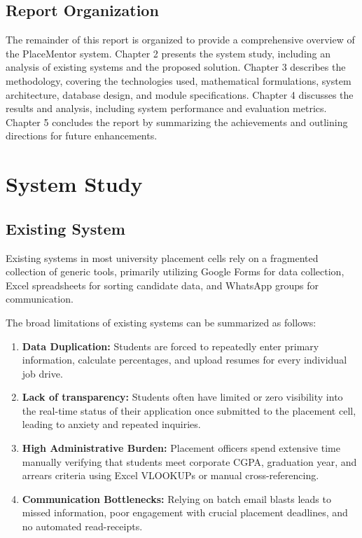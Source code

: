 \documentclass[a4paper,12pt]{report}
\begin{document}
\section{Report Organization}

The remainder of this report is organized to provide a comprehensive overview of the PlaceMentor system. Chapter 2 presents the system study, including an analysis of existing systems and the proposed solution. Chapter 3 describes the methodology, covering the technologies used, mathematical formulations, system architecture, database design, and module specifications. Chapter 4 discusses the results and analysis, including system performance and evaluation metrics. Chapter 5 concludes the report by summarizing the achievements and outlining directions for future enhancements.

\chapter{System Study}

\section{Existing System}

Existing systems in most university placement cells rely on a fragmented collection of generic tools, primarily utilizing Google Forms for data collection, Excel spreadsheets for sorting candidate data, and WhatsApp groups for communication.

The broad limitations of existing systems can be summarized as follows:
\begin{enumerate}
    \item \textbf{Data Duplication:} Students are forced to repeatedly enter primary information, calculate percentages, and upload resumes for every individual job drive.
    \item \textbf{Lack of transparency:} Students often have limited or zero visibility into the real-time status of their application once submitted to the placement cell, leading to anxiety and repeated inquiries.
    \item \textbf{High Administrative Burden:} Placement officers spend extensive time manually verifying that students meet corporate CGPA, graduation year, and arrears criteria using Excel VLOOKUPs or manual cross-referencing.
    \item \textbf{Communication Bottlenecks:} Relying on batch email blasts leads to missed information, poor engagement with crucial placement deadlines, and no automated read-receipts.
\end{enumerate}
\end{document}
